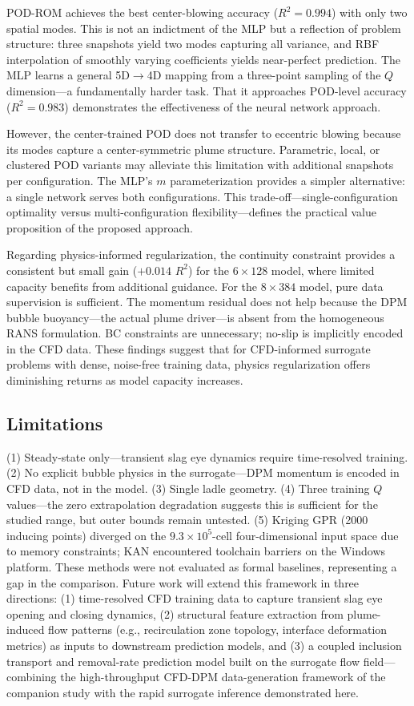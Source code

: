 \documentclass[12pt,a4paper]{article}
\begin{document}
POD-ROM achieves the best center-blowing accuracy ($R^{2}=0.994$) with only two spatial modes. This is not an indictment of the MLP but a reflection of problem structure: three snapshots yield two modes capturing all variance, and RBF interpolation of smoothly varying coefficients yields near-perfect prediction. The MLP learns a general 5D$\to$4D mapping from a three-point sampling of the $Q$ dimension---a fundamentally harder task. That it approaches POD-level accuracy ($R^{2}=0.983$) demonstrates the effectiveness of the neural network approach.

However, the center-trained POD does not transfer to eccentric blowing because its modes capture a center-symmetric plume structure. Parametric, local, or clustered POD variants may alleviate this limitation with additional snapshots per configuration. The MLP's $m$ parameterization provides a simpler alternative: a single network serves both configurations. This trade-off---single-configuration optimality versus multi-configuration flexibility---defines the practical value proposition of the proposed approach.

Regarding physics-informed regularization, the continuity constraint provides a consistent but small gain ($+0.014$ $R^{2}$) for the $6\times128$ model, where limited capacity benefits from additional guidance. For the $8\times384$ model, pure data supervision is sufficient. The momentum residual does not help because the DPM bubble buoyancy---the actual plume driver---is absent from the homogeneous RANS formulation. BC constraints are unnecessary; no-slip is implicitly encoded in the CFD data. These findings suggest that for CFD-informed surrogate problems with dense, noise-free training data, physics regularization offers diminishing returns as model capacity increases.

\subsection{Limitations}
(1) Steady-state only---transient slag eye dynamics require time-resolved training. (2) No explicit bubble physics in the surrogate---DPM momentum is encoded in CFD data, not in the model. (3) Single ladle geometry. (4) Three training $Q$ values---the zero extrapolation degradation suggests this is sufficient for the studied range, but outer bounds remain untested. (5) Kriging GPR (2000 inducing points) diverged on the $9.3\times10^{5}$-cell four-dimensional input space due to memory constraints; KAN encountered toolchain barriers on the Windows platform. These methods were not evaluated as formal baselines, representing a gap in the comparison. Future work will extend this framework in three directions: (1) time-resolved CFD training data to capture transient slag eye opening and closing dynamics, (2) structural feature extraction from plume-induced flow patterns (e.g., recirculation zone topology, interface deformation metrics) as inputs to downstream prediction models, and (3) a coupled inclusion transport and removal-rate prediction model built on the surrogate flow field---combining the high-throughput CFD-DPM data-generation framework of the companion study \cite{liu2026cfd} with the rapid surrogate inference demonstrated here.
\end{document}
